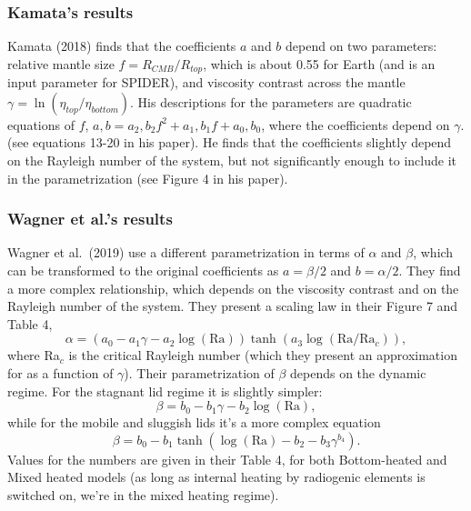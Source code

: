 \subsubsection{Kamata's results}
Kamata (2018) finds that the coefficients $a$ and $b$ depend on two parameters: relative mantle size $f = R_{CMB}/R_{top}$, which is about 0.55 for Earth (and is an input parameter for SPIDER), and viscosity contrast across the mantle $\gamma = \ln (\eta_{top}/\eta_{bottom})$.  His descriptions for the parameters are quadratic equations of $f$, $a,b = a_2,b_2 f^2 + a_1,b_1f + a_0,b_0$, where the coefficients depend on $\gamma$. (see equations 13-20 in his paper). He finds that the coefficients slightly depend on the Rayleigh number of the system, but not significantly enough to include it in the parametrization (see Figure 4 in his paper).

\subsubsection{Wagner et al.'s results}
Wagner et al.\ (2019) use a different parametrization in terms of $\alpha$ and $\beta$, which can be transformed to the original coefficients as $a = \beta/2$ and $b=\alpha/2$. They find a more complex relationship, which depends on the viscosity contrast and on the Rayleigh number of the system. They present a scaling law in their Figure 7 and Table 4,
\begin{equation}
\alpha = \left( a_0 - a_1 \gamma - a_2 \log(\text{Ra}) \right) \tanh \left( a_3 \log (\text{Ra}/\text{Ra}_c) \right),
\end{equation}
where Ra$_c$ is the critical Rayleigh number (which they present an approximation for as a function of $\gamma$). Their parametrization of $\beta$ depends on the dynamic regime. For the stagnant lid regime it is slightly simpler:
\begin{equation}
\beta = b_0 - b_1 \gamma - b_2 \log (\text{Ra}),
\end{equation}
while for the mobile and sluggish lids it's a more complex equation
\begin{equation}
\beta = b_0 - b_1  \tanh \left( \log(\text{Ra}) - b_2 - b_3 \gamma^{b_4} \right).
\end{equation}
Values for the numbers are given in their Table 4, for both Bottom-heated and Mixed heated models (as long as internal heating by radiogenic elements is switched on, we're in the mixed heating regime).
